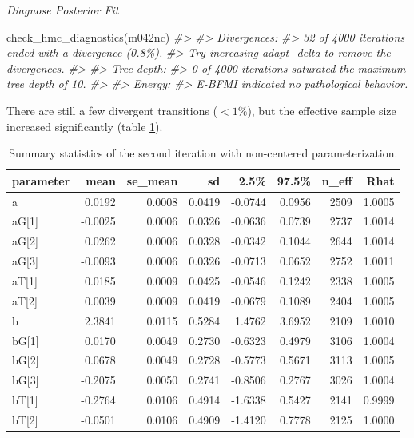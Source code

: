 \documentclass[11pt, oneside, openany]{scrbook}
\newenvironment{Shaded}{\begin{snugshade}}{\end{snugshade}}
\newcommand{\CommentTok}[1]{\textcolor[rgb]{0.56,0.35,0.01}{\textit{#1}}}
\newcommand{\FunctionTok}[1]{\textcolor[rgb]{0.00,0.00,0.00}{#1}}
\newcommand{\NormalTok}[1]{#1}
\begin{document}

\emph{Diagnose Posterior Fit}


\begin{Shaded}
\begin{Highlighting}[]
\FunctionTok{check\_hmc\_diagnostics}\NormalTok{(m042nc)}
\CommentTok{\#\textgreater{} }
\CommentTok{\#\textgreater{} Divergences:}
\CommentTok{\#\textgreater{} 32 of 4000 iterations ended with a divergence (0.8\%).}
\CommentTok{\#\textgreater{} Try increasing \textquotesingle{}adapt\_delta\textquotesingle{} to remove the divergences.}
\CommentTok{\#\textgreater{} }
\CommentTok{\#\textgreater{} Tree depth:}
\CommentTok{\#\textgreater{} 0 of 4000 iterations saturated the maximum tree depth of 10.}
\CommentTok{\#\textgreater{} }
\CommentTok{\#\textgreater{} Energy:}
\CommentTok{\#\textgreater{} E{-}BFMI indicated no pathological behavior.}
\end{Highlighting}
\end{Shaded}


There are still a few divergent transitions (\(<1\%\)), but the effective sample size increased significantly (table \ref{tab:ch042-Bleeding-Tuna}).

\begin{table}[!h]

\caption{\label{tab:ch042-Bleeding-Tuna}Summary statistics of the second iteration with non-centered parameterization.}
\centering
\begin{tabular}[t]{lrrrrrrr}
\toprule
parameter & mean & se\_mean & sd & 2.5\% & 97.5\% & n\_eff & Rhat\\
\midrule
a & 0.0192 & 0.0008 & 0.0419 & -0.0744 & 0.0956 & 2509 & 1.0005\\
aG[1] & -0.0025 & 0.0006 & 0.0326 & -0.0636 & 0.0739 & 2737 & 1.0014\\
aG[2] & 0.0262 & 0.0006 & 0.0328 & -0.0342 & 0.1044 & 2644 & 1.0014\\
aG[3] & -0.0093 & 0.0006 & 0.0326 & -0.0713 & 0.0652 & 2752 & 1.0011\\
aT[1] & 0.0185 & 0.0009 & 0.0425 & -0.0546 & 0.1242 & 2338 & 1.0005\\
\addlinespace
aT[2] & 0.0039 & 0.0009 & 0.0419 & -0.0679 & 0.1089 & 2404 & 1.0005\\
b & 2.3841 & 0.0115 & 0.5284 & 1.4762 & 3.6952 & 2109 & 1.0010\\
bG[1] & 0.0170 & 0.0049 & 0.2730 & -0.6323 & 0.4979 & 3106 & 1.0004\\
bG[2] & 0.0678 & 0.0049 & 0.2728 & -0.5773 & 0.5671 & 3113 & 1.0005\\
bG[3] & -0.2075 & 0.0050 & 0.2741 & -0.8506 & 0.2767 & 3026 & 1.0004\\
\addlinespace
bT[1] & -0.2764 & 0.0106 & 0.4914 & -1.6338 & 0.5427 & 2141 & 0.9999\\
bT[2] & -0.0501 & 0.0106 & 0.4909 & -1.4120 & 0.7778 & 2125 & 1.0000\\
\bottomrule
\end{tabular}
\end{table}
\end{document}
